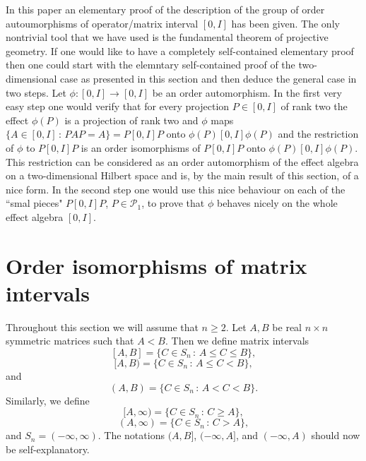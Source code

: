 \documentclass{article}
\begin{document}
In this paper an elementary proof of the description of the group of order autoumorphisms of operator/matrix interval $[0,I]$ has been given. The only nontrivial tool that we have used is the fundamental theorem of projective geometry. If one would like to have a completely self-contained elementary proof then one could start with the elemntary self-contained proof of the two-dimensional case as presented in this section and then deduce the general case in two steps. Let $\phi : [0,I] \to [0,I]$ be an order automorphism. In the first very easy step one would verify that for every projection $P \in [0,I]$ of rank two the effect $\phi (P)$ is a projection of rank two and $\phi$ maps $\{ A \in [0,I] \, : \, PAP = A \} = P[ 0,I]P$ onto $\phi (P) [0,I] \phi (P)$ and the restriction of $\phi$ to $P [0,I]P$ is an order isomorphisms of $P[ 0,I]P$ onto $\phi (P) [0,I] \phi (P)$. This restriction can be considered as an order automorphism of the effect algebra on a two-dimensional Hilbert space and is, by the main result of this section, of a nice form. In the second step one would use this nice behaviour on each of the ``smal pieces" $P[0,I]P$,  $P \in \mathcal{P}_1$, to prove that $\phi$ behaves nicely on the whole effect algebra $[0,I]$.

\section{Order isomorphisms of matrix intervals}

Throughout this section we will assume that $n \ge 2$.
Let $A,B$ be real $n \times n$ symmetric matrices such that $A < B$. Then we define matrix intervals
$$
[A,B] = \{ C \in S_n \, : \, A \le C \le B \},
$$
$$
[A,B) = \{ C \in S_n \, : \, A \le C < B \},
$$
and
$$
(A,B) = \{ C \in S_n \, : \, A < C < B \}.
$$
Similarly, we define
$$
[A, \infty ) = \{ C \in S_n \, : \, C \ge A \},
$$
$$
(A, \infty ) = \{ C \in S_n \, : \, C > A \},
$$
and $S_n = (-\infty , \infty)$. The notations $(A,B]$, $(-\infty, A]$, and $(-\infty , A)$ should now be self-explanatory.
\end{document}
